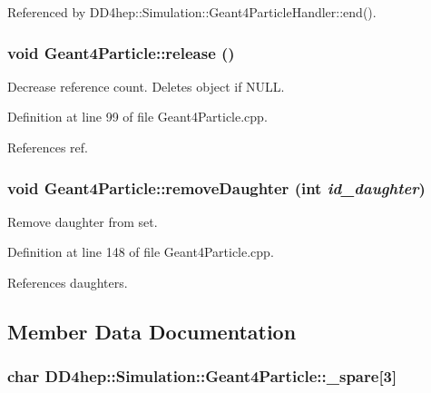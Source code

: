 Referenced by DD4hep::Simulation::Geant4ParticleHandler::end().\hypertarget{class_d_d4hep_1_1_simulation_1_1_geant4_particle_a41e9f1e5d735616691cfbf1073e08bd2}{
\subsubsection[{release}]{\setlength{\rightskip}{0pt plus 5cm}void Geant4Particle::release ()}}
\label{class_d_d4hep_1_1_simulation_1_1_geant4_particle_a41e9f1e5d735616691cfbf1073e08bd2}


Decrease reference count. Deletes object if NULL. 

Definition at line 99 of file Geant4Particle.cpp.

References ref.\hypertarget{class_d_d4hep_1_1_simulation_1_1_geant4_particle_a2a31cd8bf99c6073484ff0750c38b67c}{
\subsubsection[{removeDaughter}]{\setlength{\rightskip}{0pt plus 5cm}void Geant4Particle::removeDaughter (int {\em id\_\-daughter})}}
\label{class_d_d4hep_1_1_simulation_1_1_geant4_particle_a2a31cd8bf99c6073484ff0750c38b67c}


Remove daughter from set. 

Definition at line 148 of file Geant4Particle.cpp.

References daughters.

\subsection{Member Data Documentation}
\hypertarget{class_d_d4hep_1_1_simulation_1_1_geant4_particle_abcd4d3e8d4b0c636deff9612e7d726d0}{
\subsubsection[{\_\-spare}]{\setlength{\rightskip}{0pt plus 5cm}char {\bf DD4hep::Simulation::Geant4Particle::\_\-spare}\mbox{[}3\mbox{]}}}
\label{class_d_d4hep_1_1_simulation_1_1_geant4_particle_abcd4d3e8d4b0c636deff9612e7d726d0}


